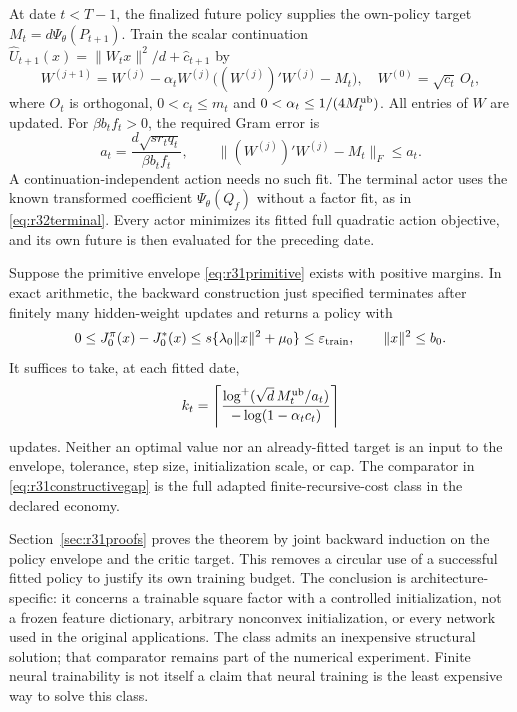 At date $t<T-1$, the finalized future policy supplies the own-policy target
$M_t=d\Psi_\theta(P_{t+1})$. Train the scalar continuation
$\widehat U_{t+1}(x)=\|W_tx\|^2/d+\widehat c_{t+1}$ by
\begin{equation}
 W^{(j+1)}=W^{(j)}-\alpha_tW^{(j)}
          \big((W^{(j)})'W^{(j)}-M_t\big),\quad
 W^{(0)}=\sqrt{c_t}\,O_t,
 \label{eq:r31training}
\end{equation}
where $O_t$ is orthogonal, $0<c_t\leq m_t$ and
$0<\alpha_t\leq1/(4M_t^{\rm ub})$. All entries of $W$ are updated.
For $\beta b_tf_t>0$, the required Gram error is
\begin{equation}
 a_t=\frac{d\sqrt{s r_tq_t}}{\beta b_tf_t},\qquad
 \|(W^{(j)})'W^{(j)}-M_t\|_F\leq a_t.
 \label{eq:r31trainingtarget}
\end{equation}
A continuation-independent action needs no such fit. The terminal actor uses the known transformed coefficient
$\Psi_\theta(Q_f)$ without a factor fit, as in \eqref{eq:r32terminal}. Every actor minimizes its fitted full quadratic action
objective, and its own future is then evaluated for the preceding date.

\begin{theorem}
\label{thm:r31constructive}
Suppose the primitive envelope \eqref{eq:r31primitive} exists with positive
margins. In exact arithmetic, the backward construction just specified
terminates after finitely many hidden-weight updates and returns a policy
with
\begin{equation}
 0\leq J_0^\pi(x)-J_0^*(x)
       \leq s\{\lambda_0\|x\|^2+\mu_0\}
       \leq\varepsilon_{\rm train},\qquad \|x\|^2\leq b_0.
 \label{eq:r31constructivegap}
\end{equation}
It suffices to take, at each fitted date,
\begin{equation}
 k_t=\left\lceil
 \frac{\log^+(\sqrt d\,M_t^{\rm ub}/a_t)}
      {-\log(1-\alpha_tc_t)}\right\rceil
 \label{eq:r31cap}
\end{equation}
updates. Neither an optimal value nor an already-fitted target is an input
to the envelope, tolerance, step size, initialization scale, or cap.
The comparator in \eqref{eq:r31constructivegap} is the full adapted
finite-recursive-cost class in the declared economy.
\end{theorem}

Section~\ref{sec:r31proofs} proves the theorem by joint backward induction on
the policy envelope and the critic target. This removes a circular use of a
successful fitted policy to justify its own training budget. The conclusion
is architecture-specific: it concerns a trainable square factor with a
controlled initialization, not a frozen feature dictionary, arbitrary
nonconvex initialization, or every network used in the original applications.
The class admits an inexpensive structural solution; that comparator remains
part of the numerical experiment. Finite neural trainability is not itself
a claim that neural training is the least expensive way to solve this class.

